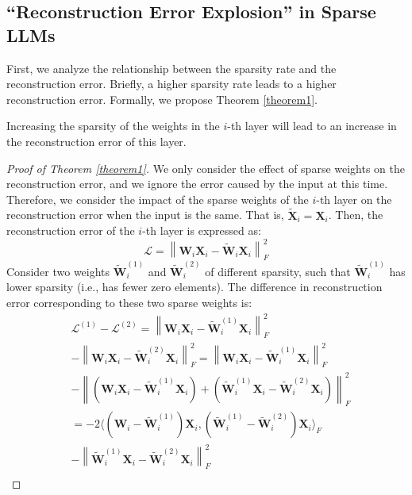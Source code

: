 \subsection{\textbf{``Reconstruction Error Explosion''
} in Sparse LLMs}\label{sec:error_analysis}
First, we analyze the relationship between the sparsity rate and the reconstruction error. Briefly, a higher sparsity rate leads to a higher reconstruction error. Formally, we propose Theorem \ref{theorem1}.
\begin{theorem}
\label{theorem1}
Increasing the sparsity of the weights in the \(i\)-th layer will lead to an increase in the reconstruction error of this layer.
\end{theorem}
\begin{proof}[Proof of Theorem \ref{theorem1}]
We only consider the effect of sparse weights on the reconstruction error, and we ignore the error caused by the input at this time. Therefore, we consider the impact of the sparse weights of the \(i\)-th layer on the reconstruction error when the input is the same. That is, \(\widetilde{\boldsymbol{X}}_{i}=\boldsymbol{X}_{i}\). Then, the reconstruction error of the \(i\)-th layer is expressed as:
\begin{equation}
    \mathcal{L} = \left\lVert \boldsymbol{W}_i\boldsymbol{X}_i - \widetilde{\boldsymbol{W}}_{i}\boldsymbol{X}_{i}\right\rVert^2_F
\end{equation}
Consider two weights \(\widetilde{\boldsymbol{W}}_{i}^{(1)}\) and \(\widetilde{\boldsymbol{W}}_{i}^{(2)}\) of different sparsity, such that \(\widetilde{\boldsymbol{W}}_{i}^{(1)}\) has lower sparsity (i.e., has fewer zero elements). The difference in reconstruction error corresponding to these two sparse weights is:
\begin{equation}
\begin{aligned}
& \mathcal{L}^{(1)}-\mathcal{L}^{(2)} = \left\lVert \boldsymbol{W}_i\boldsymbol{X}_i - \widetilde{\boldsymbol{W}}_{i}^{(1)}\boldsymbol{X}_{i}\right\rVert^2_F\\
& - \left\lVert \boldsymbol{W}_i\boldsymbol{X}_i - \widetilde{\boldsymbol{W}}_{i}^{(2)}\boldsymbol{X}_{i}\right\rVert^2_F
= \left\lVert \boldsymbol{W}_i\boldsymbol{X}_i - \widetilde{\boldsymbol{W}}_{i}^{(1)}\boldsymbol{X}_{i}\right\rVert^2_F\\
& - \left\lVert (\boldsymbol{W}_i\boldsymbol{X}_i - \widetilde{\boldsymbol{W}}_{i}^{(1)}\boldsymbol{X}_{i})+(\widetilde{\boldsymbol{W}}_{i}^{(1)}\boldsymbol{X}_{i} - \widetilde{\boldsymbol{W}}_{i}^{(2)}\boldsymbol{X}_{i})\right\rVert^2_F \\
& = -2\langle(\boldsymbol{W}_i - \widetilde{\boldsymbol{W}}_{i}^{(1)})\boldsymbol{X}_{i}, (\widetilde{\boldsymbol{W}}_{i}^{(1)} - \widetilde{\boldsymbol{W}}_{i}^{(2)})\boldsymbol{X}_{i} \rangle_F \\
& - \left\lVert \widetilde{\boldsymbol{W}}_{i}^{(1)}\boldsymbol{X}_{i} - \widetilde{\boldsymbol{W}}_{i}^{(2)}\boldsymbol{X}_{i}\right\rVert^2_F\\
\end{aligned}
\end{equation}


\end{proof}
